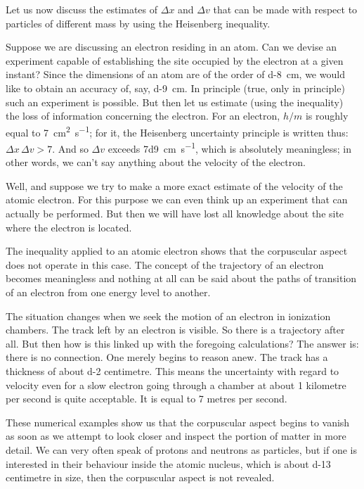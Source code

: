 Let us now discuss the estimates of $\Delta x$ and $\Delta v$ that can be made with respect to particles of different mass by using the Heisenberg inequality.

Suppose we are discussing an electron residing in an atom. Can we devise an experiment capable of establishing the site occupied by the electron at a given instant? Since the dimensions of an atom are of the order of \SI{d-8}{\centi\meter}, we would like to obtain an accuracy of, say, \SI{d-9}{\centi\meter}. In principle (true, only in principle) such an experiment is possible. But then let us estimate (using the inequality) the loss of information concerning the electron. For an electron, $h/m$ is roughly equal to \SI{7}{\centi\meter\squared\per\second}; for it, the Heisenberg uncertainty principle is written thus: $\Delta x \, \Delta v >7$. And so $\Delta v$ exceeds \SI{7d9}{\centi\meter\per\second}, which is absolutely meaningless; in other words, we can't say anything about the velocity of the electron.

Well, and suppose we try to make a more exact estimate of the velocity of the atomic electron. For this purpose we can even think up an experiment that can actually be performed. But then we will have lost all knowledge about the site where the electron is located.

The inequality applied to an atomic electron shows that the corpuscular aspect does not operate in this case. The concept of the trajectory of an electron becomes meaningless and nothing at all can be said about the paths of transition of an electron from one energy level to another.

The situation changes when we seek the motion of an electron in ionization chambers. The track left by an electron is visible. So there is a trajectory after all. But then how is this linked up with the foregoing calculations? The answer is: there is no connection. One merely begins to reason anew. The track has a thickness of about \num{d-2} centimetre. This means the uncertainty with regard to velocity even for a slow electron going through a chamber at about 1 kilometre per second is quite acceptable. It is equal to 7 metres per second.

These numerical examples show us that the corpuscular aspect begins to vanish as soon as we attempt to look closer and inspect the portion of matter in more detail.
We can very often speak of protons and neutrons as particles, but if one is interested in their behaviour inside the atomic nucleus, which is about \num{d-13} centimetre in size, then the corpuscular aspect is not revealed.

